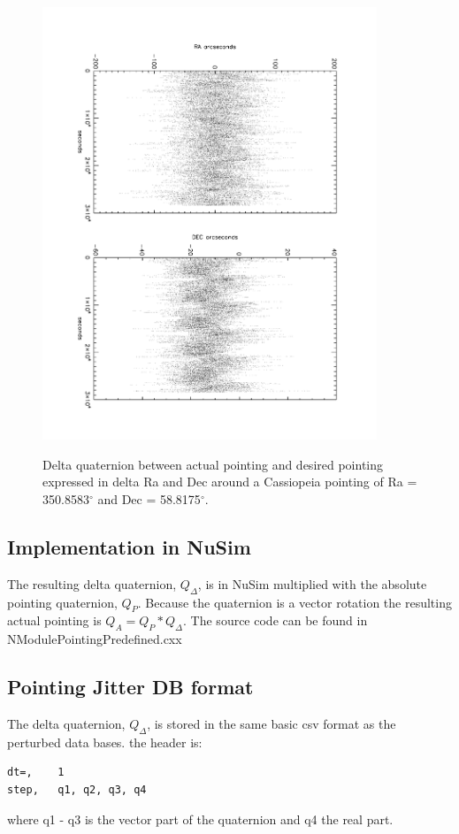 \begin{figure}[th]
\includegraphics[width=10cm, angle=90]{images/Qdelta.pdf} 
\label{deltaq}
\caption{Delta quaternion between actual pointing and desired pointing expressed in delta Ra and Dec around a Cassiopeia pointing of Ra = 350.8583$^\circ$ and Dec = 58.8175$^\circ$.}
\end{figure}

\subsection{Implementation in NuSim}
The resulting delta quaternion, $Q_\Delta$, is in NuSim multiplied with the absolute pointing quaternion, $Q_P$. Because the quaternion is a vector rotation the resulting actual pointing is $Q_A = Q_P * Q_\Delta$. The source code can be found in NModulePointingPredefined.cxx

\subsection{Pointing Jitter DB format}
The delta quaternion, $Q_\Delta$, is stored in the same basic csv format as the perturbed data bases. the header is:
\begin{verbatim}
dt=,	1			
step,	q1,	q2,	q3,	q4
\end{verbatim}
where q1 - q3 is the vector part of the quaternion and q4 the real part. 

